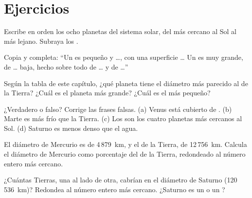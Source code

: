 \section{Ejercicios}

\begin{exercise}[$\star$]\label{exo:g6:earth-a-planet:1}
Escribe en orden los ocho planetas del sistema solar, del más cercano al
Sol al más lejano. Subraya los .
\end{exercise}

\begin{exercise}[$\star$]\label{exo:g6:earth-a-planet:2}
Copia y completa: ``Un  es pequeño y \ldots, con una
superficie \ldots{} Un  es muy grande, de \ldots{} baja,
hecho sobre todo de \ldots{} y de \ldots{}''
\end{exercise}

\begin{exercise}[$\star$]\label{exo:g6:earth-a-planet:3}
Según la tabla de este capítulo, ¿qué planeta tiene el diámetro más
parecido al de la Tierra? ¿Cuál es el planeta más grande? ¿Cuál es el más
pequeño?
\end{exercise}

\begin{exercise}[$\star$]\label{exo:g6:earth-a-planet:4}
¿Verdadero o falso? Corrige las frases falsas.
(a) Venus está cubierto de .
(b) Marte es más frío que la Tierra.
(c) Los  son los cuatro planetas más cercanos al Sol.
(d) Saturno es menos denso que el agua.
\end{exercise}

\begin{exercise}[$\star\star$]\label{exo:g6:earth-a-planet:5}
El diámetro de Mercurio es de 4\,879~km, y el de la Tierra, de
12\,756~km. Calcula el diámetro de Mercurio como porcentaje del de la
Tierra, redondeado al número entero más cercano.
\end{exercise}

\begin{exercise}[$\star\star$]\label{exo:g6:earth-a-planet:6}
¿Cuántas Tierras, una al lado de otra, cabrían en el diámetro de Saturno
(120\,536~km)? Redondea al número entero más cercano. ¿Saturno es un
 o un ?
\end{exercise}


